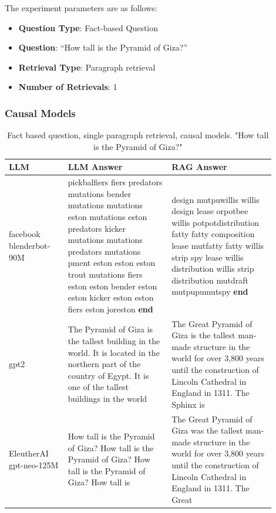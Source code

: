 \documentclass{wseas}
\begin{document}
The experiment parameters are as follows:

\begin{itemize}
\item
  \textbf{Question Type}: Fact-based Question
\item
  \textbf{Question}: ``How tall is the Pyramid of Giza?''
\item
  \textbf{Retrieval Type}: Paragraph retrieval
\item
  \textbf{Number of Retrievals}: 1
\end{itemize}

\subsubsection{Causal Models}

\begin{table}[htbp]
  \centering
  \caption{Fact based question, single paragraph retrieval, causal models. "How tall is the Pyramid of Giza?"} %
  \label{tab:experiment_R_1_paragraph_Q_fact_M_casual_table}  %
  \begin{tabular}{|p{0.20\linewidth}|p{0.35\linewidth}|p{0.35\linewidth}|}
    \hline
    \textbf{LLM} & \textbf{LLM Answer} & \textbf{RAG Answer} \\ \hline
    facebook blenderbot-90M & pickbalfiers fiers predators mutations bender mutations mutations eston mutations eston predators kicker mutations mutations predators mutations pment eston eston eston trout mutations fiers eston eston bender eston eston kicker eston eston fiers eston joreston \textbf{end} & design mutpuwillis willis design lease orpotbee willis potpotdistribution fatty fatty composition lease mutfatty fatty willis strip spy lease willis distribution willis strip distribution mutdraft mutpupumutspy \textbf{end} \\ \hline
    gpt2 & The Pyramid of Giza is the tallest building in the world. It is located in the northern part of the country of Egypt. It is one of the tallest buildings in the world & The Great Pyramid of Giza is the tallest man-made structure in the world for over 3,800 years until the construction of Lincoln Cathedral in England in 1311. The Sphinx is \\ \hline
    EleutherAI gpt-neo-125M & How tall is the Pyramid of Giza? How tall is the Pyramid of Giza? How tall is the Pyramid of Giza? How tall is & The Great Pyramid of Giza was the tallest man-made structure in the world for over 3,800 years until the construction of Lincoln Cathedral in England in 1311. The Great \\ \hline

\end{tabular}
\end{table}
\end{document}
